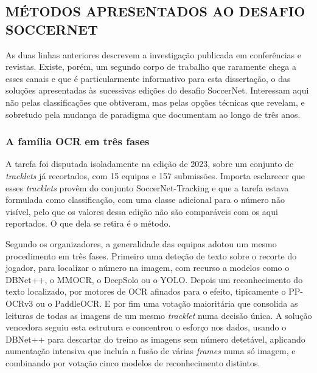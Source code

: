 
\subsection{MÉTODOS APRESENTADOS AO DESAFIO SOCCERNET}
\label{sec:jnr_desafio}

As duas linhas anteriores descrevem a investigação publicada em conferências e revistas.
Existe, porém, um segundo corpo de trabalho que raramente chega a esses canais e que é
particularmente informativo para esta dissertação, o das soluções apresentadas às sucessivas
edições do desafio SoccerNet. Interessam aqui não pelas classificações que obtiveram, mas
pelas opções técnicas que revelam, e sobretudo pela mudança de paradigma que documentam ao
longo de três anos.

\subsubsection*{A família OCR em três fases}

A tarefa foi disputada isoladamente na edição de 2023, sobre um conjunto de \emph{tracklets}
já recortados, com 15 equipas e 157 submissões. Importa esclarecer que esses \emph{tracklets}
provêm do conjunto SoccerNet-Tracking e que a tarefa estava formulada como classificação, com
uma classe adicional para o número não visível, pelo que os valores dessa edição não são
comparáveis com os aqui reportados. O que dela se retira é o método.

Segundo os organizadores, a generalidade das equipas adotou um mesmo procedimento em três
fases. Primeiro uma deteção de texto sobre o recorte do jogador, para localizar o número na
imagem, com recurso a modelos como o DBNet++, o MMOCR, o DeepSolo ou o YOLO. Depois um
reconhecimento do texto localizado, por motores de OCR afinados para o efeito, tipicamente o
PP-OCRv3 ou o PaddleOCR. E por fim uma votação maioritária que consolida as leituras de todas
as imagens de um mesmo \emph{tracklet} numa decisão única. A solução vencedora seguiu esta
estrutura e concentrou o esforço nos dados, usando o DBNet++ para descartar do treino as
imagens sem número detetável, aplicando aumentação intensiva que incluía a fusão de várias
\emph{frames} numa só imagem, e combinando por votação cinco modelos de reconhecimento
distintos.

